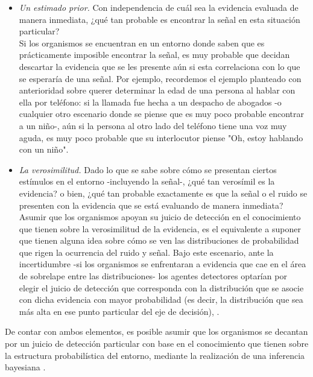 \begin{itemize}
\item \textsl{Un estimado prior.} Con independencia de cuál sea la evidencia evaluada de manera inmediata, ¿qué tan probable es encontrar la señal en esta situación particular?\\

Si los organismos se encuentran en un entorno donde saben que es prácticamente imposible encontrar la señal, es muy probable que decidan descartar la evidencia que se les presente aún si esta correlaciona con lo que se esperaría de una señal. Por ejemplo, recordemos el ejemplo planteado con anterioridad sobre querer determinar la edad de una persona al hablar con ella por teléfono: si la llamada fue hecha a un despacho de abogados -o cualquier otro escenario donde se piense que es muy poco probable encontrar a un niño-, aún si la persona al otro lado del teléfono tiene una voz muy aguda, es muy poco probable que su interlocutor piense "Oh, estoy hablando con un niño".\\

\item \textsl{La verosimilitud.} Dado lo que se sabe sobre cómo se presentan ciertos estímulos en el entorno -incluyendo la señal-, ¿qué tan verosímil es la evidencia? o bien, ¿qué tan probable exactamente es que la señal o el ruido se presenten con la evidencia que se está evaluando de manera inmediata?\\

Asumir que los organismos apoyan su juicio de detección en el conocimiento que tienen sobre la verosimilitud de la evidencia, es el equivalente a suponer que tienen alguna idea sobre cómo se ven las distribuciones de probabilidad que rigen la ocurrencia del ruido y señal. Bajo este escenario, ante la incertidumbre -si los organismos se enfrentaran a evidencia que cae en el área de sobrelape entre las distribuciones- los agentes detectores optarían por elegir el juicio de detección que corresponda con la distribución que se asocie con dicha evidencia con mayor probabilidad (es decir, la distribución que sea más alta en ese punto particular del eje de decisión), \parencite{Nevin1969}.\\
\end{itemize}

De contar con ambos elementos, es posible asumir que los organismos se decantan por un juicio de detección particular con base en el conocimiento que tienen sobre la estructura probabilística del entorno, mediante la realización de una inferencia bayesiana \parencite{WeijiMa, WeijiMa2012, Pouget2013}.\\

